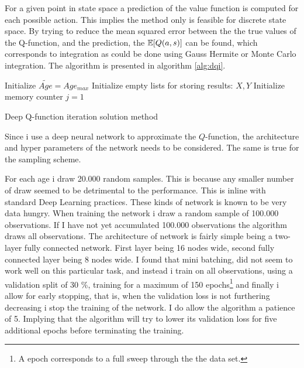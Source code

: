 For a given point in state space a prediction of the value function is computed for each possible action. This implies the method only is feasible for discrete state space. By trying to reduce the mean squared error between the the true values of the Q-function, and the prediction, the $\mathbb{E}[Q(a, s)]$ can be found, which corresponds to integration as could be done using Gauss Hermite or Monte Carlo integration. The algorithm is presented in algorithm \ref{alg:dqi}.

\begin{algorithm}[H]
\SetAlgoLined
{}
 Initialize $\tilde{Age} = Age_{max}$\;
 Initialize empty lists for storing results: $X, Y$\;
 Initialize memory counter $j=1$\;
 \caption{Deep Q-function iteration solution method}
 \label{alg:dqi}
 \end{algorithm}

Since i use a deep neural network to approximate the $Q$-function, the architecture and hyper parameters of the network needs to be considered. The same is true for the sampling scheme.

For each age i draw 20.000 random samples. This is because any smaller number of draw seemed to be detrimental to the performance. This is inline with standard Deep Learning practices. These kinds of network is known to be very data hungry. When training the network i draw a random sample of 100.000 observations. If I have not yet accumulated 100.000 observations the algorithm draws all observations. The architecture of network is fairly simple being a two-layer fully connected network. First layer being 16 nodes wide, second fully connected layer being 8 nodes wide. I found that mini batching, did not seem to work well on this particular task, and instead i train on all observations, using a validation split of 30 \%, training for a maximum of 150 epochs\footnote{A epoch corresponds to a full sweep through the the data set.} and finally i allow for early stopping, that is, when the validation loss is not furthering decreasing i stop the training of the network. I do allow the algorithm a patience of 5. Implying that the algorithm will try to lower its validation loss for five additional epochs before terminating the training.


